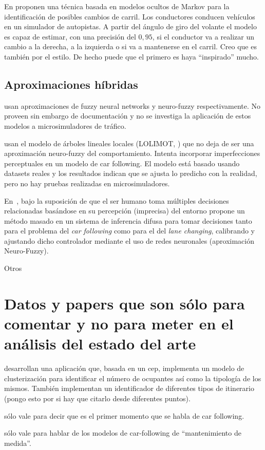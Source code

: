 En \cite{Hou2011} proponen una técnica basada en modelos ocultos de Markov para la identificación de posibles cambios de carril. Los conductores conducen vehículos en un simulador de autopistas. A partir del ángulo de giro del volante el modelo es capaz de estimar, con una precisión del $0,95$, si el conductor va a realizar un cambio a la derecha, a la izquierda o si va a mantenerse en el carril. Creo que \cite{Berndt2008} es también por el estilo. De hecho puede que el primero es haya \enquote{inspirado} mucho.

\subsection{Aproximaciones híbridas}

\cite{Li2003, Ma2004} usan aproximaciones de fuzzy neural networks y neuro-fuzzy respectivamente. No proveen sin embargo de documentación y no se investiga la aplicación de estos modelos a microsimuladores de tráfico.

\cite{Aghabayk2013} usan el modelo de árboles lineales locales (LOLIMOT, \cite{Nelles2013}) que no deja de ser una aproximación neuro-fuzzy del comportamiento. Intenta incorporar imperfecciones perceptuales en un modelo de car following. El modelo está basado usando datasets reales y los resultados indican que se ajusta lo predicho con la realidad, pero no hay pruebas realizadas en microsimuladores.

En~\cite{Ma2004}, bajo la suposición de que el ser humano toma múltiples decisiones relacionadas basándose en su percepción (imprecisa) del entorno propone un método masado en un sistema de inferencia difusa para tomar decisiones tanto para el problema del \textit{car following} como para el del \textit{lane changing}, calibrando y ajustando dicho controlador mediante el uso de redes neuronales (aproximación Neuro-Fuzzy).

Otros~\cite{Colombaroni2013,Kesting2008,Chong2011,Abbas2011,Chong2011a,Abbas2012,Chong2013}

\section{Datos y papers que son sólo para comentar y no para meter en el análisis del estado del arte}

\cite{terroso2015complex} desarrollan una aplicación que, basada en un \gls{cep}, implementa un modelo de clusterización para identificar el número de ocupantes así como la tipología de los mismos. También implementan un identificador de diferentes tipos de itinerario (pongo esto por si hay que citarlo desde diferentes puntos).

\cite{reuschel1950} sólo vale para decir que es el primer momento que se habla de car following.

\cite{Pipes1953} sólo vale para hablar de los modelos de car-following de \enquote{mantenimiento de medida}.

